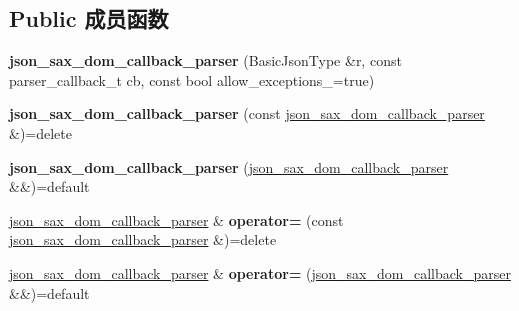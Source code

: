 \subsection*{Public 成员函数}
\begin{DoxyCompactItemize}
\item 
\mbox{\label{classnlohmann_1_1detail_1_1json__sax__dom__callback__parser_afec9434e54590f10df51b062973d4daf}} 
{\bfseries json\+\_\+sax\+\_\+dom\+\_\+callback\+\_\+parser} (Basic\+Json\+Type \&r, const parser\+\_\+callback\+\_\+t cb, const bool allow\+\_\+exceptions\+\_\+=true)
\item 
\mbox{\label{classnlohmann_1_1detail_1_1json__sax__dom__callback__parser_a589998730e650a425b1b311e2e9f7f09}} 
{\bfseries json\+\_\+sax\+\_\+dom\+\_\+callback\+\_\+parser} (const \mbox{\hyperlink{classnlohmann_1_1detail_1_1json__sax__dom__callback__parser}{json\+\_\+sax\+\_\+dom\+\_\+callback\+\_\+parser}} \&)=delete
\item 
\mbox{\label{classnlohmann_1_1detail_1_1json__sax__dom__callback__parser_af1ce6c746e3ebadb7994170725fcdbb5}} 
{\bfseries json\+\_\+sax\+\_\+dom\+\_\+callback\+\_\+parser} (\mbox{\hyperlink{classnlohmann_1_1detail_1_1json__sax__dom__callback__parser}{json\+\_\+sax\+\_\+dom\+\_\+callback\+\_\+parser}} \&\&)=default
\item 
\mbox{\label{classnlohmann_1_1detail_1_1json__sax__dom__callback__parser_a5c9603e79a71713f5e8cf12cba837dbb}} 
\mbox{\hyperlink{classnlohmann_1_1detail_1_1json__sax__dom__callback__parser}{json\+\_\+sax\+\_\+dom\+\_\+callback\+\_\+parser}} \& {\bfseries operator=} (const \mbox{\hyperlink{classnlohmann_1_1detail_1_1json__sax__dom__callback__parser}{json\+\_\+sax\+\_\+dom\+\_\+callback\+\_\+parser}} \&)=delete
\item 
\mbox{\label{classnlohmann_1_1detail_1_1json__sax__dom__callback__parser_a60753ffbec958de15de807852e62cde8}} 
\mbox{\hyperlink{classnlohmann_1_1detail_1_1json__sax__dom__callback__parser}{json\+\_\+sax\+\_\+dom\+\_\+callback\+\_\+parser}} \& {\bfseries operator=} (\mbox{\hyperlink{classnlohmann_1_1detail_1_1json__sax__dom__callback__parser}{json\+\_\+sax\+\_\+dom\+\_\+callback\+\_\+parser}} \&\&)=default

\end{DoxyCompactItemize}
